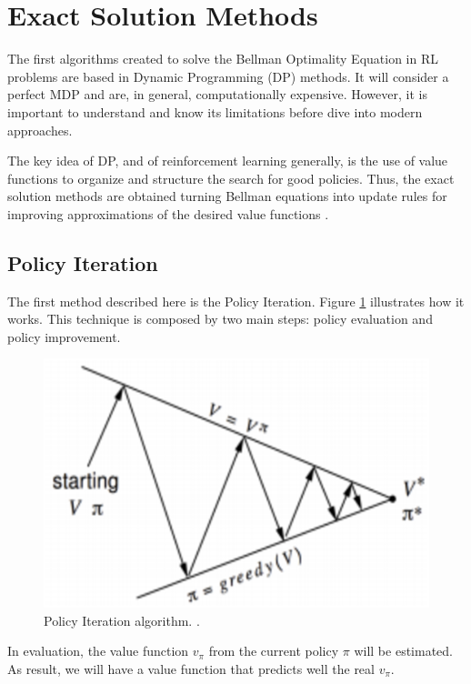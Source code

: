 \section{Exact Solution Methods}\label{sec:exactsolutionmethods}
The first algorithms created to solve the Bellman Optimality Equation in RL problems are based in Dynamic Programming (DP) methods. It will consider a perfect MDP and are, in general, computationally expensive. However, it is important to understand and know its limitations before dive into modern approaches.

The key idea of DP, and of reinforcement learning generally, is the use of value functions to organize
and structure the search for good policies. Thus, the exact solution methods are obtained turning Bellman equations into update rules for improving approximations of the
desired value functions \cite{sutton1998rli}.

\subsection{Policy Iteration}

The first method described here is the Policy Iteration. Figure \ref{fig:policyiteration} illustrates how it works. This technique is composed by two main steps: policy evaluation and policy improvement.


\begin{figure}[!htpb]
	\centering
	\includegraphics[scale=0.5]{Cap4/policyiteration.eps}
	\caption{Policy Iteration algorithm. \cite{davidsilverlec3}.}
	\label{fig:policyiteration}
\end{figure}

In evaluation, the value function $v_{\pi}$ from the current policy $\pi$ will be estimated. As result, we will have a value function that predicts well the real $v_{\pi}$.

